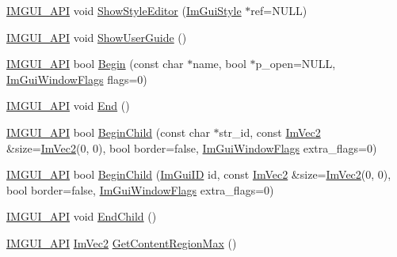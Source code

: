 \begin{DoxyCompactItemize}
\mbox{\hyperlink{imgui_8h_a43829975e84e45d1149597467a14bbf5}{I\+M\+G\+U\+I\+\_\+\+A\+PI}} void \mbox{\hyperlink{namespace_im_gui_ab2eb3dec78d054fe3feab1c091ec5de5}{Show\+Style\+Editor}} (\mbox{\hyperlink{struct_im_gui_style}{Im\+Gui\+Style}} $\ast$ref=N\+U\+LL)
\item 
\mbox{\hyperlink{imgui_8h_a43829975e84e45d1149597467a14bbf5}{I\+M\+G\+U\+I\+\_\+\+A\+PI}} void \mbox{\hyperlink{namespace_im_gui_ad6f4919bc9aa806ca8d2c1d6e2bfb051}{Show\+User\+Guide}} ()
\item 
\mbox{\hyperlink{imgui_8h_a43829975e84e45d1149597467a14bbf5}{I\+M\+G\+U\+I\+\_\+\+A\+PI}} bool \mbox{\hyperlink{namespace_im_gui_a581e58db0bc930bafa4a5d23093a2b99}{Begin}} (const char $\ast$name, bool $\ast$p\+\_\+open=N\+U\+LL, \mbox{\hyperlink{imgui_8h_a0b8e067ab4f7a818828c8d89e531addc}{Im\+Gui\+Window\+Flags}} flags=0)
\item 
\mbox{\hyperlink{imgui_8h_a43829975e84e45d1149597467a14bbf5}{I\+M\+G\+U\+I\+\_\+\+A\+PI}} void \mbox{\hyperlink{namespace_im_gui_a5479d93794a004c67ceb6d13f37c8254}{End}} ()
\item 
\mbox{\hyperlink{imgui_8h_a43829975e84e45d1149597467a14bbf5}{I\+M\+G\+U\+I\+\_\+\+A\+PI}} bool \mbox{\hyperlink{namespace_im_gui_a93b10a516e6da427b743906ad97d7f16}{Begin\+Child}} (const char $\ast$str\+\_\+id, const \mbox{\hyperlink{struct_im_vec2}{Im\+Vec2}} \&size=\mbox{\hyperlink{struct_im_vec2}{Im\+Vec2}}(0, 0), bool border=false, \mbox{\hyperlink{imgui_8h_a0b8e067ab4f7a818828c8d89e531addc}{Im\+Gui\+Window\+Flags}} extra\+\_\+flags=0)
\item 
\mbox{\hyperlink{imgui_8h_a43829975e84e45d1149597467a14bbf5}{I\+M\+G\+U\+I\+\_\+\+A\+PI}} bool \mbox{\hyperlink{namespace_im_gui_a3320a3f36d9d8b227f93a015792379d3}{Begin\+Child}} (\mbox{\hyperlink{imgui_8h_a1785c9b6f4e16406764a85f32582236f}{Im\+Gui\+ID}} id, const \mbox{\hyperlink{struct_im_vec2}{Im\+Vec2}} \&size=\mbox{\hyperlink{struct_im_vec2}{Im\+Vec2}}(0, 0), bool border=false, \mbox{\hyperlink{imgui_8h_a0b8e067ab4f7a818828c8d89e531addc}{Im\+Gui\+Window\+Flags}} extra\+\_\+flags=0)
\item 
\mbox{\hyperlink{imgui_8h_a43829975e84e45d1149597467a14bbf5}{I\+M\+G\+U\+I\+\_\+\+A\+PI}} void \mbox{\hyperlink{namespace_im_gui_af8de559a88c1442d6df8c1b04c86e997}{End\+Child}} ()
\item 
\mbox{\hyperlink{imgui_8h_a43829975e84e45d1149597467a14bbf5}{I\+M\+G\+U\+I\+\_\+\+A\+PI}} \mbox{\hyperlink{struct_im_vec2}{Im\+Vec2}} \mbox{\hyperlink{namespace_im_gui_a0a4dbfabbfa45d74319ef541962ce2eb}{Get\+Content\+Region\+Max}} ()

\end{DoxyCompactItemize}

